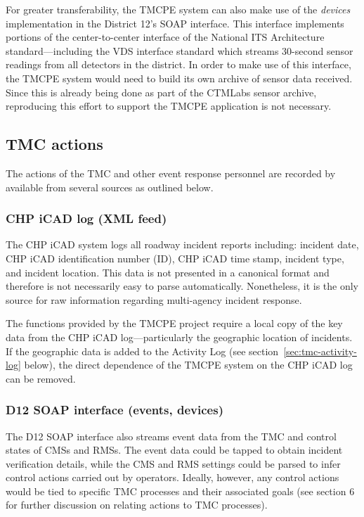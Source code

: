 \documentclass[12pt]{report}
\newcounter{time}
\begin{document}
For greater transferability, the \ac{TMCPE} system can also make use
of the \emph{devices} implementation in the District 12's SOAP
interface.  This interface implements portions of the center-to-center
interface of the National ITS Architecture standard---including the
VDS interface standard which streams 30-second sensor readings from
all detectors in the district.  In order to make use of this
interface, the \ac{TMCPE} system would need to build its own archive
of sensor data received.  Since this is already being done as part of
the \ac{CTMLabs} sensor archive, reproducing this effort to support
the \ac{TMCPE} application is not necessary.

\subsection{TMC actions}
\label{sec:tmc-actions}

The actions of the \ac{TMC} and other event response personnel are
recorded by available from several sources as outlined below.

\subsubsection{CHP iCAD log (XML feed)}
\label{sec:chp-icad-log}

The \ac{CHP} \ac{iCAD} system logs all roadway incident reports
including: incident date, \ac{CHP} \ac{iCAD} identification number
(ID), \ac{CHP} \ac{iCAD} time stamp, incident type, and incident
location. This data is not presented in a canonical format and
therefore is not necessarily easy to parse automatically.  Nonetheless,
it is the only source for raw information regarding multi-agency
incident response.

The functions provided by the \ac{TMCPE} project require a local copy
of the key data from the \ac{CHP} \ac{iCAD} log---particularly the
geographic location of incidents.  If the geographic data is added to
the Activity Log (see section~\ref{sec:tmc-activity-log} below), the
direct dependence of the \ac{TMCPE} system on the \ac{CHP} \ac{iCAD}
log can be removed.

\subsubsection{D12 SOAP interface (events, devices)}
\label{sec:d12-soap-interface}

The \ac{D12} SOAP interface also streams event data from the \ac{TMC} and
control states of \acp{CMS} and \acp{RMS}.  The event data could be
tapped to obtain incident verification details, while the \ac{CMS} and
\ac{RMS} settings could be parsed to infer control actions carried out
by operators.  Ideally, however, any control actions would be tied to
specific \ac{TMC} processes and their associated goals (see section 6
for further discussion on relating actions to \ac{TMC} processes).
\end{document}
